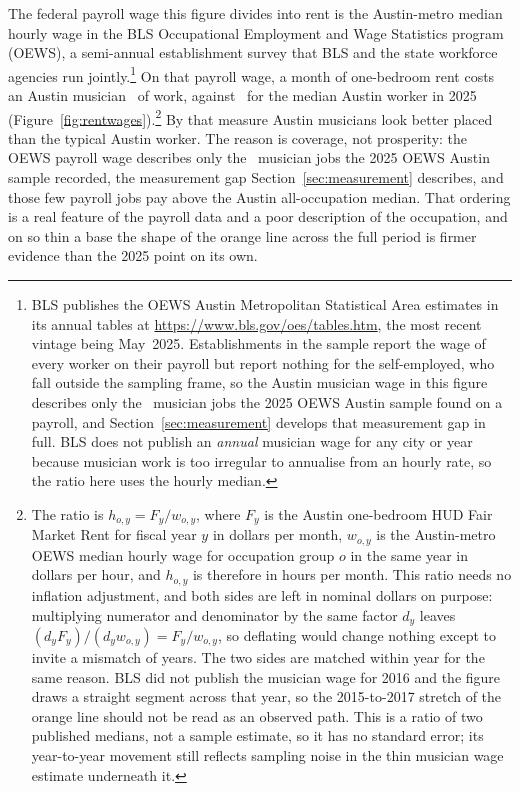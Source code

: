 The federal payroll wage this figure divides into rent is the Austin-metro
median hourly wage in the BLS Occupational Employment and Wage Statistics
program (OEWS), a semi-annual establishment survey that BLS and the state
workforce agencies run jointly.\footnote{BLS publishes the OEWS Austin
Metropolitan Statistical Area estimates in its annual tables at
\url{https://www.bls.gov/oes/tables.htm}, the most recent vintage being
May~2025. Establishments in the sample report the wage of every worker on
their payroll but report nothing for the self-employed, who fall outside the
sampling frame, so the Austin musician wage in this figure describes only the
\NEmpPayrollMusiciansAustinLast\ musician jobs the 2025 OEWS Austin sample
found on a payroll, and Section~\ref{sec:measurement} develops that
measurement gap in full. BLS does not publish an \emph{annual} musician wage
for any city or year because musician work is too irregular to annualise from
an hourly rate, so the ratio here uses the hourly median.} On that payroll
wage, a month of one-bedroom rent costs an Austin musician
\NColAnchorHoursMusicianLatest\ of work, against
\NColAnchorHoursAlloccLatest\ for the median Austin worker in 2025
(Figure~\ref{fig:rentwages}).\footnote{The ratio is
\(h_{o,y} = F_y / w_{o,y}\), where \(F_y\) is the Austin one-bedroom HUD Fair
Market Rent for fiscal year \(y\) in dollars per month, \(w_{o,y}\) is the
Austin-metro OEWS median hourly wage for occupation group \(o\) in the same
year in dollars per hour, and \(h_{o,y}\) is therefore in hours per month.
This ratio needs no inflation adjustment, and both sides are left in nominal
dollars on purpose: multiplying numerator and denominator by the same factor
\(d_y\) leaves \((d_y F_y)/(d_y w_{o,y}) = F_y / w_{o,y}\), so deflating would
change nothing except to invite a mismatch of years. The two sides are
matched within year for the same reason. BLS did not publish the musician
wage for 2016 and the figure draws a straight segment across that year, so
the 2015-to-2017 stretch of the orange line should not be read as an observed
path. This is a ratio of two published medians, not a sample estimate, so
it has no standard error; its year-to-year movement still reflects sampling
noise in the thin musician wage estimate underneath it.} By that measure
Austin musicians look better placed than the typical Austin worker. The
reason is coverage, not prosperity: the OEWS payroll wage describes only the
\NEmpPayrollMusiciansAustinLast\ musician jobs the 2025 OEWS Austin sample
recorded, the measurement gap Section~\ref{sec:measurement} describes, and
those few payroll jobs pay above the
Austin all-occupation median. That ordering is a real feature of the payroll
data and a poor description of the occupation, and on so thin a base the
shape of the orange line across the full period is firmer evidence than the
2025 point on its own.

